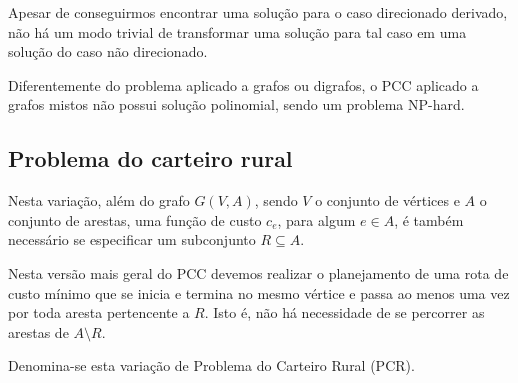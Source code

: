 \documentclass[12pt, a4paper]{article}
\begin{document}
    \begin{center}
        \hspace{3cm}%
    \end{center}

    Apesar de conseguirmos encontrar uma solução para o caso direcionado derivado, não há um modo trivial de transformar uma solução para tal caso em uma solução do caso não direcionado.

    Diferentemente do problema aplicado a grafos ou digrafos, o PCC aplicado a grafos mistos não possui solução polinomial, sendo um problema NP-hard. 

    \subsection{Problema do carteiro rural}
    
    Nesta variação, além do grafo $G(V, A)$, sendo $V$ o conjunto de vértices e $A$ o conjunto de arestas, uma função de custo $c_e$, para algum $e\in A$, é também necessário se especificar um subconjunto $R \subseteq A$. 

    Nesta versão mais geral do PCC devemos realizar o planejamento de uma rota de custo mínimo que se inicia e termina no mesmo vértice e passa ao menos uma vez por toda aresta pertencente a $R$. 
    Isto é, não há necessidade de se percorrer as arestas de $A \setminus R$.

    Denomina-se esta variação de Problema do Carteiro Rural (PCR).
\end{document}
